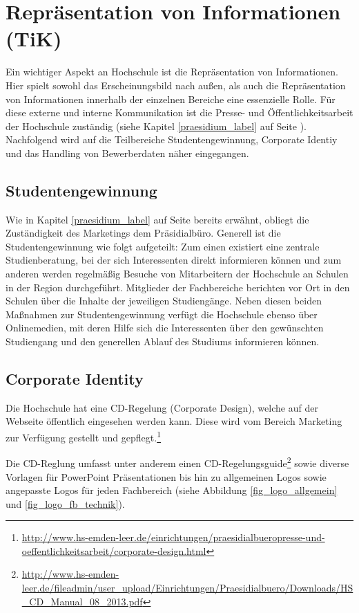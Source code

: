 \section{Repräsentation von Informationen (TiK)}
Ein wichtiger Aspekt an Hochschule ist die Repräsentation von Informationen. Hier spielt sowohl das Erscheinungsbild nach außen, als auch die Repräsentation von Informationen innerhalb der einzelnen Bereiche eine essenzielle Rolle. Für diese externe und interne Kommunikation ist die Presse- und Öffentlichkeitsarbeit der Hochschule zuständig (siehe Kapitel \ref{praesidium_label} auf Seite \pageref{praesidium_label}). Nachfolgend wird auf die Teilbereiche   Studentengewinnung, Corporate Identiy und das Handling von Bewerberdaten näher eingegangen.

\subsection{Studentengewinnung}
Wie in Kapitel \ref{praesidium_label} auf Seite \pageref{praesidium_label} bereits erwähnt, obliegt die Zuständigkeit des Marketings dem Präsidialbüro. Generell ist die Studentengewinnung wie folgt aufgeteilt: Zum einen existiert eine zentrale Studienberatung, bei der sich Interessenten direkt informieren können und zum anderen werden regelmäßig Besuche von Mitarbeitern der Hochschule an Schulen in der Region durchgeführt. Mitglieder der Fachbereiche berichten vor Ort in den Schulen über die Inhalte der jeweiligen Studiengänge. Neben diesen beiden Maßnahmen zur Studentengewinnung verfügt die Hochschule ebenso über Onlinemedien, mit deren Hilfe sich die Interessenten über den gewünschten Studiengang und den generellen Ablauf des  Studiums informieren können. 


\subsection{Corporate Identity}
Die Hochschule hat eine CD-Regelung (Corporate Design), welche auf der Webseite öffentlich eingesehen werden kann. Diese wird vom Bereich Marketing zur Verfügung gestellt und gepflegt.\footnote{\url{http://www.hs-emden-leer.de/einrichtungen/praesidialbueropresse-und-oeffentlichkeitsarbeit/corporate-design.html}}

Die CD-Reglung umfasst unter anderem einen CD-Regelungsguide\footnote{\url{http://www.hs-emden-leer.de/fileadmin/user_upload/Einrichtungen/Praesidialbuero/Downloads/HS_CD_Manual_08_2013.pdf}} sowie diverse Vorlagen für PowerPoint Präsentationen bis hin zu allgemeinen Logos sowie angepasste Logos für jeden Fachbereich (siehe Abbildung \ref{fig_logo_allgemein} und \ref{fig_logo_fb_technik}).

